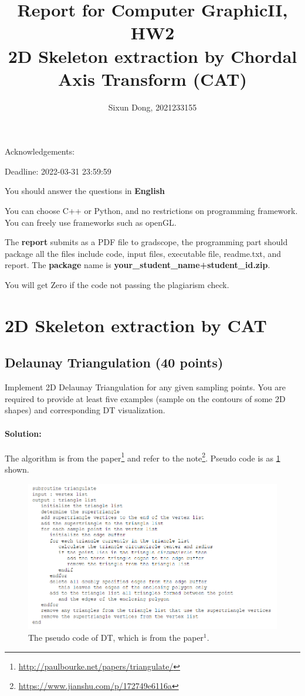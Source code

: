 \documentclass[]{article}
\title{Report for Computer GraphicII, HW2 \\ 2D Skeleton extraction by Chordal Axis Transform (CAT) }
\author{Sixun Dong, 2021233155}
\begin{document}
\maketitle
Acknowledgements:

Deadline: 2022-03-31 23:59:59


You should answer the questions in \textbf{English}


You can choose C++ or Python, and no restrictions on programming framework. You can freely use frameworks such as openGL.

The \textbf{report} submits as a PDF file to gradscope, the programming part should package all the files include code, input files, executable file, readme.txt, and report. The \textbf{package} name is  \textbf{your\_student\_name+student\_id.zip}.

You will get Zero if the code not passing the plagiarism check.
\newpage
\section{2D Skeleton extraction by CAT}
\subsection{Delaunay Triangulation (40 points)}
Implement 2D Delaunay Triangulation for any given sampling points. You are required to provide at least five examples (sample on the contours of some 2D shapes) and corresponding DT visualization. 

\paragraph{\color{red}Solution:}

The algorithm is from the paper\footnote[1]{\url{http://paulbourke.net/papers/triangulate/}} and refer to the note\footnote[2]{\url{https://www.jianshu.com/p/172749e6116a}}. Pseudo code is as \cref{fig:q1code} shown.
\begin{figure}[ht]
    \centering
    \includegraphics[width=\textwidth]{q1code.png}
    \caption{The pseudo code of DT, which is from the paper$^1$.}
    \label{fig:q1code}
\end{figure}
\end{document}

